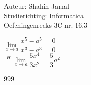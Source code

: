 \documentclass[a4paper]{article}
\begin{document}
  
\noindent \large Auteur: Shahin Jamal \\
\noindent \large Studierichting: Informatica\\
\noindent \large Oefeningenreeks 3C nr. 16.3\\

\medskip

\normalsize

$\lim\limits_{x \rightarrow a}\dfrac{x^5 - a^5}{x^3 - a^3} = \dfrac{0}{0}$\\

$\overset{H}{=} \lim\limits_{x \rightarrow a}\dfrac{5x^4}{3x^2} = \dfrac{5}{3}a^2$\\

\begin{thebibliography}{999}
\end{thebibliography}
\end{document}
